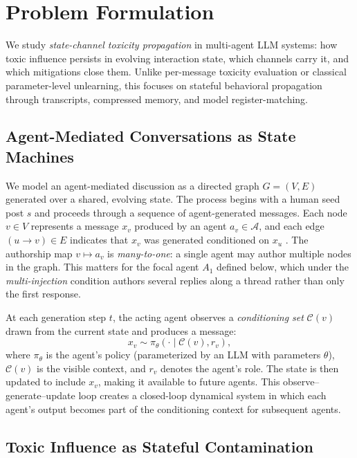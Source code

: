 \section{Problem Formulation}
\label{sec:problem}
We study \emph{state-channel toxicity propagation} in multi-agent LLM systems: how toxic influence persists in evolving interaction state, which channels carry it, and which mitigations close them. Unlike per-message toxicity evaluation or classical parameter-level unlearning, this focuses on stateful behavioral propagation through transcripts, compressed memory, and model register-matching.

\subsection{Agent-Mediated Conversations as State Machines}
\label{subsec:setup_notation}
We model an agent-mediated discussion as a directed graph $G = (V, E)$ generated over a shared, evolving state.
The process begins with a human seed post $s$ and proceeds through a sequence of agent-generated messages.
Each node $v \in V$ represents a message $x_v$ produced by an agent $a_v \in \mathcal{A}$, and each edge $(u \to v) \in E$ indicates that $x_v$ was generated conditioned on $x_u$ .
The authorship map $v \mapsto a_v$ is \emph{many-to-one}: a single agent may author multiple nodes in the graph.
This matters for the focal agent $A_1$ defined below, which under the \emph{multi-injection} condition authors several replies along a thread rather than only the first response.

At each generation step $t$, the acting agent observes a \emph{conditioning set} $\mathcal{C}(v)$ drawn from the current state and produces a message:
\begin{equation}
    x_v \sim \pi_\theta(\cdot \mid \mathcal{C}(v), r_v),
\end{equation}
where $\pi_\theta$ is the agent's policy (parameterized by an LLM with parameters $\theta$), $\mathcal{C}(v)$ is the visible context, and $r_v$ denotes the agent's role.
The state is then updated to include $x_v$, making it available to future agents. This observe--generate--update loop creates a closed-loop dynamical system in which each agent's output becomes part of the conditioning context for subsequent agents.

\subsection{Toxic Influence as Stateful Contamination}
 
